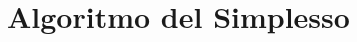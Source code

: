 \documentclass[\main/main.tex]{subfiles}
\begin{document}
\chapter{Algoritmo del Simplesso}
\end{document}
